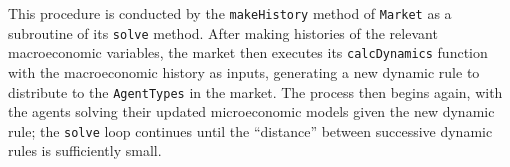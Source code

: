 \documentclass[10pt,twocolumn]{article}
\let\rmarkdownfootnote\footnote%
\def\footnote{\protect\rmarkdownfootnote}
\begin{document}
This procedure is conducted by the \texttt{makeHistory} method of
\texttt{Market} as a subroutine of its \texttt{solve} method. After
making histories of the relevant macroeconomic variables, the market
then executes its \texttt{calcDynamics} function with the macroeconomic
history as inputs, generating a new dynamic rule to distribute to the
\texttt{AgentTypes} in the market. The process then begins again, with
the agents solving their updated microeconomic models given the new
dynamic rule; the \texttt{solve} loop continues until the ``distance''
between successive dynamic rules is sufficiently small.

\end{document}
